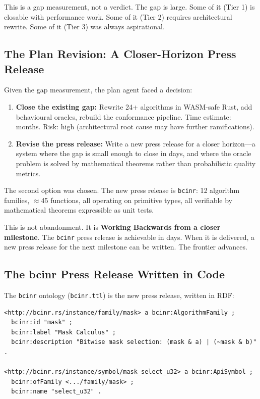 \documentclass[11pt,a4paper]{article}
\newcommand{\code}[1]{\texttt{#1}}
\begin{document}
This is a gap measurement, not a verdict.  The gap is large.  Some of it
(Tier 1) is closable with performance work.  Some of it (Tier 2) requires
architectural rewrite.  Some of it (Tier 3) was always aspirational.

\subsection{The Plan Revision: A Closer-Horizon Press Release}

Given the gap measurement, the plan agent faced a decision:
\begin{enumerate}
  \item \textbf{Close the existing gap:} Rewrite 24+ algorithms in WASM-safe
    Rust, add behavioural oracles, rebuild the conformance pipeline.
    Time estimate: months.  Risk: high (architectural root cause may have
    further ramifications).
  \item \textbf{Revise the press release:} Write a new press release for a
    closer horizon---a system where the gap is small enough to close in days,
    and where the oracle problem is solved by mathematical theorems rather
    than probabilistic quality metrics.
\end{enumerate}

The second option was chosen.  The new press release is \code{bcinr}: 12
algorithm families, $\approx$45 functions, all operating on primitive types,
all verifiable by mathematical theorems expressible as unit tests.

This is not abandonment.  It is \textbf{Working Backwards from a closer
milestone}.  The \code{bcinr} press release is achievable in days.  When it
is delivered, a new press release for the next milestone can be written.
The frontier advances.

\subsection{The bcinr Press Release Written in Code}

The \code{bcinr} ontology (\code{bcinr.ttl}) is the new press release,
written in RDF:

\begin{lstlisting}
<http://bcinr.rs/instance/family/mask> a bcinr:AlgorithmFamily ;
  bcinr:id "mask" ;
  bcinr:label "Mask Calculus" ;
  bcinr:description "Bitwise mask selection: (mask & a) | (~mask & b)" .

<http://bcinr.rs/instance/symbol/mask_select_u32> a bcinr:ApiSymbol ;
  bcinr:ofFamily <.../family/mask> ;
  bcinr:name "select_u32" .
\end{lstlisting}
\end{document}
